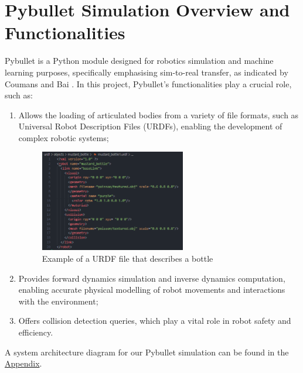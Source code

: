 \documentclass[11pt, a4paper]{report}
\begin{document}
\section{Pybullet Simulation Overview and Functionalities}\label{sec:3.1}
Pybullet is a Python module designed for robotics simulation and machine learning purposes, specifically emphasising sim-to-real transfer, as indicated by Coumans and Bai \cite{coumans2021}. In this project, Pybullet's functionalities play a crucial role, such as:
\begin{enumerate}[\itemsep=0em]
    \item Allows the loading of articulated bodies from a variety of file formats, such as Universal Robot Description Files (URDFs), enabling the development of complex robotic systems;
    \begin{figure}[H]
        \centering
        \includegraphics[width=0.6\textwidth]{docs/Project Report/Media/3_1_urdf_eg.png}
        \caption{Example of a URDF file that describes a bottle}
        \label{fig:3.1}
    \end{figure}
    \vspace{-0.2cm}
    \item Provides forward dynamics simulation and inverse dynamics computation, enabling accurate physical modelling of robot movements and interactions with the environment;
    \item Offers collision detection queries, which play a vital role in robot safety and efficiency.
\end{enumerate}
A system architecture diagram for our Pybullet simulation can be found in the \hyperref[apdx:1]{Appendix}.
\end{document}
